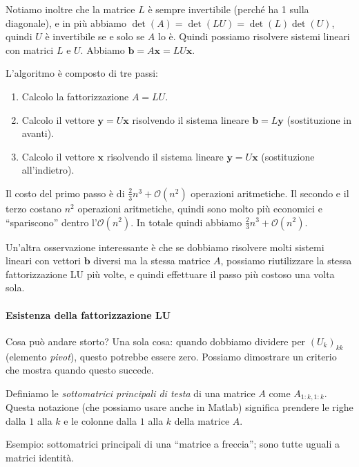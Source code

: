 \documentclass[a4paper]{report}
\theoremstyle{definiton}
\theoremstyle{remark}
\newcommand{\x}{\mathbf{x}}
\renewcommand{\b}{\mathbf{b}}
\begin{document}
Notiamo inoltre che la matrice $L$ è sempre invertibile (perché ha 1 sulla diagonale), e in più abbiamo $\det(A) = \det(LU) = \det(L) \det(U)$, quindi $U$ è invertibile se e solo se $A$ lo è. Quindi possiamo risolvere sistemi lineari con matrici $L$ e $U$. Abbiamo $\b = A\x = LU\x$.

L'algoritmo è composto di tre passi:
\begin{enumerate}
    \item Calcolo la fattorizzazione $A=LU$.
    \item Calcolo il vettore $\mathbf{y}=U\x$ risolvendo il sistema lineare $\b=L\mathbf{y}$ (sostituzione in avanti).
    \item Calcolo il vettore $\x$ risolvendo il sistema lineare $\mathbf{y}=U\x$ (sostituzione all'indietro).
\end{enumerate}
Il costo del primo passo è di $\frac23 n^3 + \mathcal{O}(n^2)$ operazioni aritmetiche. Il secondo e il terzo costano $n^2$ operazioni aritmetiche, quindi sono molto più economici e ``spariscono'' dentro l'$\mathcal{O}(n^2)$. In totale quindi abbiamo $\frac23 n^3 + \mathcal{O}(n^2)$.

Un'altra osservazione interessante è che se dobbiamo risolvere molti sistemi lineari con vettori $\b$ diversi ma la stessa matrice $A$, possiamo riutilizzare la stessa fattorizzazione LU più volte, e quindi effettuare il passo più costoso una volta sola.

\paragraph{Esistenza della fattorizzazione LU}

Cosa può andare storto? Una sola cosa: quando dobbiamo dividere per $(U_k)_{kk}$ (elemento \emph{pivot}), questo potrebbe essere zero. Possiamo dimostrare un criterio che mostra quando questo succede.

Definiamo le \emph{sottomatrici principali di testa} di una matrice $A$ come $A_{1:k,1:k}$. Questa notazione (che possiamo usare anche in Matlab) significa prendere le righe dalla $1$ alla $k$ e le colonne dalla $1$ alla $k$ della matrice $A$.

Esempio: sottomatrici principali di una ``matrice a freccia''; sono tutte uguali a matrici identità.
\end{document}

